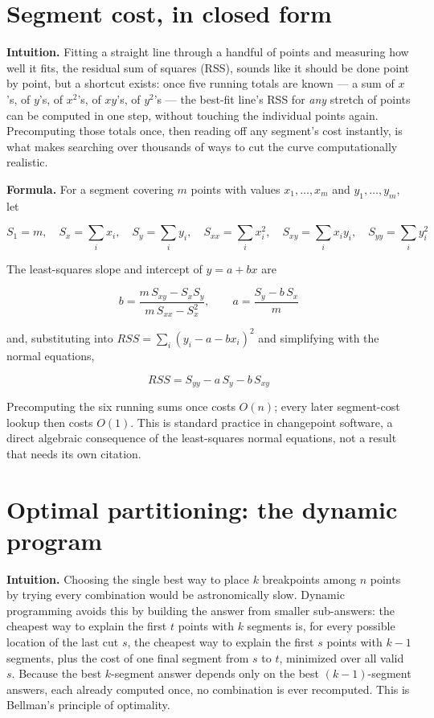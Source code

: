 \documentclass[11pt]{article}
\begin{document}
\section{Segment cost, in closed form}

\textbf{Intuition.} Fitting a straight line through a handful of points and
measuring how well it fits, the residual sum of squares (RSS), sounds like
it should be done point by point, but a shortcut exists: once five running
totals are known --- a sum of $x$'s, of $y$'s, of $x^2$'s, of $xy$'s, of
$y^2$'s --- the best-fit line's RSS for \emph{any} stretch of points can be
computed in one step, without touching the individual points again.
Precomputing those totals once, then reading off any segment's cost
instantly, is what makes searching over thousands of ways to cut the curve
computationally realistic.

\textbf{Formula.} For a segment covering $m$ points with values $x_1,
\dots, x_m$ and $y_1, \dots, y_m$, let

\begin{equation}
S_1 = m,\quad S_x = \sum_i x_i,\quad S_y = \sum_i y_i,\quad S_{xx} = \sum_i x_i^2,\quad S_{xy} = \sum_i x_i y_i,\quad S_{yy} = \sum_i y_i^2
\end{equation}

The least-squares slope and intercept of $y = a + bx$ are

\begin{equation}
b = \frac{m\,S_{xy} - S_x S_y}{m\,S_{xx} - S_x^2}, \qquad a = \frac{S_y - b\,S_x}{m}
\end{equation}

and, substituting into $RSS = \sum_i (y_i - a - b x_i)^2$ and simplifying
with the normal equations,

\begin{equation}
RSS = S_{yy} - a\,S_y - b\,S_{xy}
\end{equation}

Precomputing the six running sums once costs $O(n)$; every later
segment-cost lookup then costs $O(1)$. This is standard practice in
changepoint software, a direct algebraic consequence of the least-squares
normal equations, not a result that needs its own citation.

\section{Optimal partitioning: the dynamic program}
\label{sec:dp}

\textbf{Intuition.} Choosing the single best way to place $k$ breakpoints
among $n$ points by trying every combination would be astronomically slow.
Dynamic programming avoids this by building the answer from smaller
sub-answers: the cheapest way to explain the first $t$ points with $k$
segments is, for every possible location of the last cut $s$, the cheapest
way to explain the first $s$ points with $k-1$ segments, plus the cost of
one final segment from $s$ to $t$, minimized over all valid $s$. Because the
best $k$-segment answer depends only on the best $(k-1)$-segment answers,
each already computed once, no combination is ever recomputed. This is
Bellman's principle of optimality.
\end{document}
